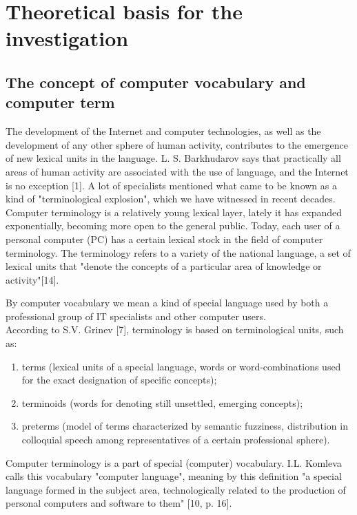 \documentclass[12pt, a4paper, twoside]{report}
\begin{document}
\chapter{Theoretical basis for the investigation}
\section{The concept of computer vocabulary and computer term}

The development of the Internet and computer technologies, as well as the develop\-ment of any other sphere of human activity, contributes to the emergence of new lexical units in the language. L. S. Barkhudarov says that practically all areas of human activity are associated with the use of language, and the Internet is no exception [1]. A lot of specialists mentioned what came to be known as a kind of "terminological explosion", which we have witnessed in recent decades. Computer terminology is a relatively young lexical layer, lately it has expanded exponentially, becoming more open to the general public. Today, each user of a personal computer (PC) has a certain lexical stock in the field of computer terminology. The terminology refers to a variety of the national language, a set of lexical units that "denote the concepts of a particular area of knowledge or activity"[14].

By computer vocabulary we mean a kind of special language used by both a professional group of IT specialists and other computer users.\\

According to S.V. Grinev [7], terminology is based on terminological units, such as:
\begin{enumerate}
    \item terms (lexical units of a special language, words or word-combinations used for the exact designation of specific concepts);
    \item terminoids (words for denoting still unsettled, emerging concepts);
    \item preterms (model of terms characterized by semantic fuzziness, distribution in colloquial speech among representatives of a certain professional sphere).
\end{enumerate}
Computer terminology is a part of special (computer) vocabulary. I.L. Komleva calls this vocabulary "computer language", meaning by this definition "a special language formed in the subject area, technologically related to the production of personal computers and software to them" [10, p. 16].
\end{document}
